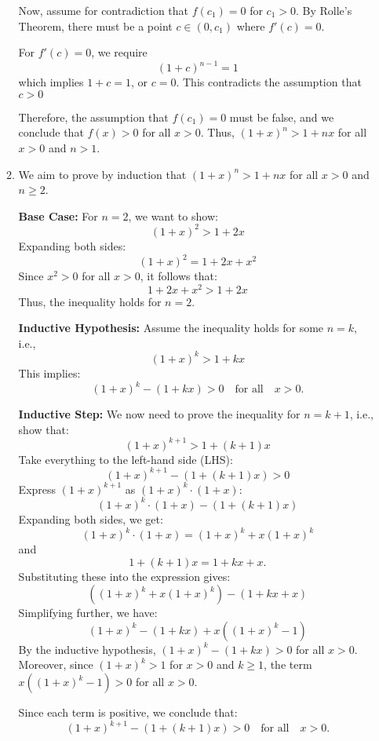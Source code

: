 \documentclass[12pt]{article}
\begin{document}
\begin{enumerate}[start=1,label={\bfseries. },leftmargin=1in]
\begin{enumerate}
    Now, assume for contradiction that $f(c_1) = 0$ for $c_1 > 0$. By Rolle's Theorem, there must be a point \( c \in (0, c_1) \) where \( f'(c) = 0\).

    For \( f'(c) = 0 \), we require
    \[
    (1 + c)^{n-1} = 1
    \]
    which implies \( 1 + c = 1 \), or \( c = 0 \). This contradicts the assumption that $c>0$

    Therefore, the assumption that \( f(c_1) = 0 \) must be false, and we conclude that \( f(x) > 0 \) for all \( x > 0 \). Thus, \( (1 + x)^n > 1 + nx \) for all \( x > 0 \) and \( n > 1 \).

    \item We aim to prove by induction that \((1 + x)^n > 1 + nx\) for all \( x > 0 \) and \( n \geq 2 \).
    
    \textbf{Base Case:} For \( n = 2 \), we want to show:
    \[
    (1 + x)^2 > 1 + 2x
    \]
    Expanding both sides:
    \[
    (1 + x)^2 = 1 + 2x + x^2
    \]
    Since \( x^2 > 0 \) for all \( x > 0 \), it follows that:
    \[
    1 + 2x + x^2 > 1 + 2x
    \]
    Thus, the inequality holds for \( n = 2 \).

    \textbf{Inductive Hypothesis:} Assume the inequality holds for some \( n = k \), i.e., 
    \[
    (1 + x)^k > 1 + kx
    \]
    This implies:
    \[
    (1 + x)^k - (1 + kx) > 0 \quad \text{for all} \quad x > 0.
    \]

    \textbf{Inductive Step:} We now need to prove the inequality for \( n = k+1 \), i.e., show that:
    \[
    (1 + x)^{k+1} > 1 + (k+1)x
    \]
    Take everything to the left-hand side (LHS):
    \[
    (1 + x)^{k+1} - (1 + (k+1)x) > 0
    \]
    Express \( (1 + x)^{k+1} \) as \( (1 + x)^k \cdot (1 + x) \):
    \[
    (1 + x)^k \cdot (1 + x) - (1 + (k+1)x)
    \]
    Expanding both sides, we get:
    \[
    (1 + x)^k \cdot (1 + x) = (1 + x)^k + x(1 + x)^k
    \]
    and
    \[
    1 + (k+1)x = 1 + kx + x.
    \]
    Substituting these into the expression gives:
    \[
    \left( (1 + x)^k + x(1 + x)^k \right) - (1 + kx + x)
    \]
    Simplifying further, we have:
    \[
    (1 + x)^k - (1 + kx) + x \left( (1 + x)^k - 1 \right)
    \]
    By the inductive hypothesis, \( (1 + x)^k - (1 + kx) > 0 \) for all \( x > 0 \). Moreover, since \( (1 + x)^k > 1 \) for \( x > 0 \) and \( k \geq 1 \), the term \( x \left( (1 + x)^k - 1 \right) > 0 \) for all \( x > 0 \).

    Since each term is positive, we conclude that:
    \[
    (1 + x)^{k+1} - (1 + (k+1)x) > 0 \quad \text{for all} \quad x > 0.
    \]
\end{enumerate}


\end{enumerate}
\end{document}
